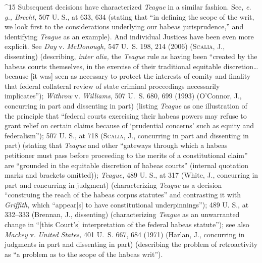 {{{^15 Subsequent decisions have characterized \emph{Teague} in a similar
fashion. See, \emph{e. g., Brecht,} 507 U. S., at 633, 634 (stating
that ``in defining the scope of the writ, we look first to the
considerations underlying our habeas jurisprudence,'' and identifying
\emph{Teague} as an example). And individual Justices have been even more
explicit. See \emph{Day} v. \emph{McDonough,} 547 U.~S. 198, 214 (2006)
(\textsc{Scalia,} J., dissenting) (describing, \emph{inter alia,} the \emph{Teague}
rule as having been ``created by the habeas courts themselves, in the
exercise of their traditional equitable discretion\dots because [it
was] seen as necessary to protect the interests of comity and finality
that federal collateral review of state criminal proceedings necessarily
implicates''); \emph{Withrow} v. \emph{Williams,} 507 U.~S. 680, 699 (1993)
(O'Connor, J., concurring in part \newpage  and dissenting in part)
(listing \emph{Teague} as one illustration of the principle that ``federal
courts exercising their habeas powers may refuse to grant relief on
certain claims because of ‘prudential concerns' such as equity and
federalism''); 507 U. S., at 718 (\textsc{Scalia,} J., concurring in part
and dissenting in part) (stating that \emph{Teague} and other ``gateways
through which a habeas petitioner must pass before proceeding to the
merits of a constitutional claim'' are ``grounded in the equitable
discretion of habeas courts'' (internal quotation marks and brackets
omitted)); \emph{Teague,} 489 U. S., at 317 (White, J., concurring in part
and concurring in judgment) (characterizing \emph{Teague} as a decision
``construing the reach of the habeas corpus statutes'' and contrasting
it with \emph{Griffith,} which ``appear[s] to have constitutional
underpinnings''); 489 U. S., at 332--333 (Brennan, J., dissenting)
(characterizing \emph{Teague} as an unwarranted change in ``[this
Court's] interpretation of the federal habeas statute''); see also
\emph{Mackey} v. \emph{United States,} 401 U.~S. 667, 684 (1971) (Harlan, J.,
concurring in judgments in part and dissenting in part) (describing the
problem of retroactivity as ``a problem as to the scope of the habeas
writ'').

}}}
